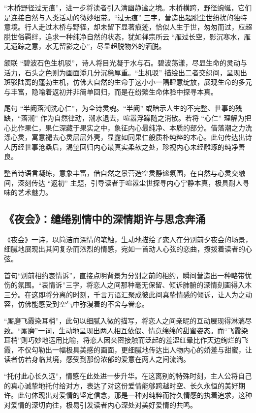 \documentclass{article}
\begin{document}
“木桥野径过无痕”，进一步将读者引入清幽静谧之境。木桥横跨，野径蜿蜒，它们是连接自然与人类活动的微妙纽带。“过无痕” 三字，营造出超脱尘世纷扰的独特意境。行人走过木桥与野径，却未留下显著痕迹，恰似人生于世，匆匆而过，应超脱世俗羁绊，追求一种纯净自然的状态，犹如禅宗所云 “雁过长空，影沉寒水，雁无遗踪之意，水无留影之心”，尽显超脱物外的洒脱。

颔联 “碧波石色生机驳”，诗人将目光凝于水与石。碧波荡漾，尽显生命的灵动与活力，石头之色则为画面添几分沉稳厚重。“生机驳” 描绘出二者交织间，呈现出斑驳陆离的蓬勃生机，仿佛大自然的生命于这小小一隅肆意绽放，展现生命的多元与丰富，隐喻着返初并非简单回归，而是在纷繁生命体验中探寻本真。

尾句 “半阙落潮洗心仁”，为全诗灵魂。“半阙” 或暗示人生的不完整、世事的残缺，“落潮” 作为自然律动，潮水退去，喧嚣浮躁随之消散。若将 “心仁” 理解为把心比作果仁，果仁深藏于果实之中，象征内心最纯净、本质的部分。借落潮之力洗涤心灵，寓意褪去心灵层层外壳，显露如同果仁般质朴纯粹的本心。此句传达出诗人历经世事沧桑后，渴望回归内心最真实柔软之处，珍视内心未经雕琢的纯净善良。

整首诗语言凝练，意象丰富，借自然之景营造空灵静谧氛围，在自然与心灵交融间，深刻传达 “返初” 主题，引导读者于喧嚣尘世探寻内心宁静本真，极具耐人寻味的艺术魅力。

\subsection{《夜会》：缱绻别情中的深情期许与思念奔涌}\label{sec:ye-hui}

《夜会》一诗，以简洁而深情的笔触，生动地描绘了恋人在分别前夕夜会的场景，细腻地展现出其间复杂而浓烈的情感，宛如一首动人心弦的恋曲，撩拨着读者的心弦。

首句“别前相约衷情诉”，直接点明背景为分别之前的相约，瞬间营造出一种略带忧伤的氛围。“衷情诉”三字，将恋人之间那种毫无保留、倾诉肺腑的深情刻画得入木三分。在这即将分离的时刻，千言万语汇聚成彼此间真挚情感的倾诉，让人为之动容，仿佛能感受到空气中弥漫着的不舍与眷恋。

“厮磨飞霞染耳梢”，此句以细腻入微的描写，将恋人之间亲昵的互动展现得淋漓尽致。“厮磨”一词，生动地呈现出两人相互依偎、情意绵绵的甜蜜姿态。而“飞霞染耳梢”则巧妙地运用比喻，将恋人因亲密接触而泛起的羞涩红晕比作天边绚烂的飞霞，不仅勾勒出一幅极具美感的画面，更细腻地传达出人物内心的娇羞与甜蜜，让读者仿若身临其境，感受到那份浓郁的爱意在两人之间流淌。

“托付此心长久远”，情感在此处进一步升华。在这离别的特殊时刻，主人公将自己的真心诚挚地托付给对方，表达了对这份爱情能够跨越时空、长久永恒的美好期许。此句体现出对爱情的坚定信念，那是一种对纯粹而持久情感的执着追求，这种对爱情的深切向往，极易引发读者内心深处对美好爱情的共鸣。
\end{document}

